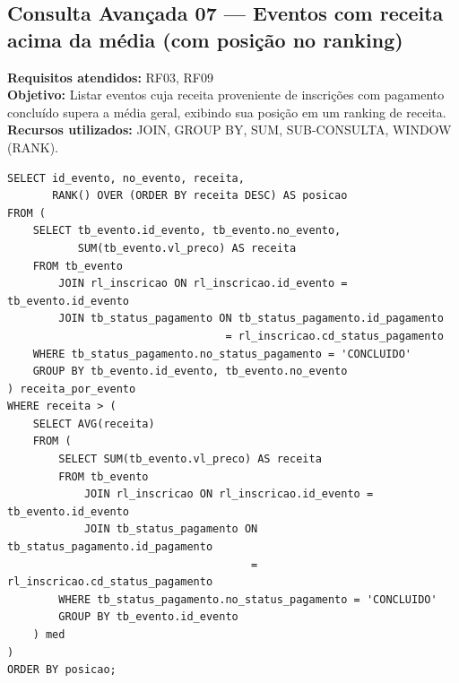 \documentclass[12pt,a4paper]{article}
\begin{document}
\subsection{Consulta Avançada 07 --- Eventos com receita acima da média (com posição no ranking)}
\textbf{Requisitos atendidos:} RF03, RF09 \\
\textbf{Objetivo:} Listar eventos cuja receita proveniente de inscrições com pagamento concluído supera a média geral, exibindo sua posição em um ranking de receita. \\
\textbf{Recursos utilizados:} JOIN, GROUP BY, SUM, SUB-CONSULTA, WINDOW (RANK).
\begin{lstlisting}[caption={QA07 --- Eventos com receita acima da média.}]
SELECT id_evento, no_evento, receita,
       RANK() OVER (ORDER BY receita DESC) AS posicao
FROM (
    SELECT tb_evento.id_evento, tb_evento.no_evento,
           SUM(tb_evento.vl_preco) AS receita
    FROM tb_evento
        JOIN rl_inscricao ON rl_inscricao.id_evento = tb_evento.id_evento
        JOIN tb_status_pagamento ON tb_status_pagamento.id_pagamento
                                  = rl_inscricao.cd_status_pagamento
    WHERE tb_status_pagamento.no_status_pagamento = 'CONCLUIDO'
    GROUP BY tb_evento.id_evento, tb_evento.no_evento
) receita_por_evento
WHERE receita > (
    SELECT AVG(receita)
    FROM (
        SELECT SUM(tb_evento.vl_preco) AS receita
        FROM tb_evento
            JOIN rl_inscricao ON rl_inscricao.id_evento = tb_evento.id_evento
            JOIN tb_status_pagamento ON tb_status_pagamento.id_pagamento
                                      = rl_inscricao.cd_status_pagamento
        WHERE tb_status_pagamento.no_status_pagamento = 'CONCLUIDO'
        GROUP BY tb_evento.id_evento
    ) med
)
ORDER BY posicao;
\end{lstlisting}
\end{document}
